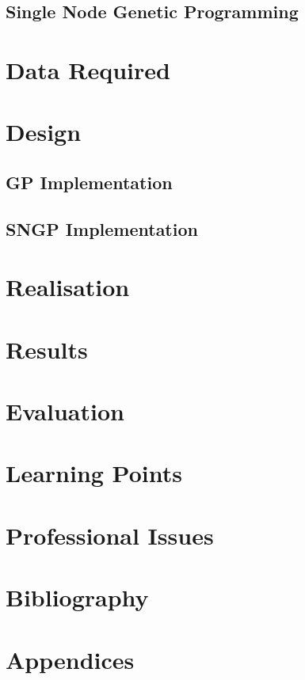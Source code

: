 \documentclass{article}
\begin{document}
		\subsection{Single Node Genetic Programming}
		 
		
	
	\section{Data Required}
	
	\section{Design}
	
		\subsection{GP Implementation}
		
		\subsection{SNGP Implementation}
	
	\section{Realisation}
	
	\section{Results}
	
	
	
	\section{Evaluation}
	
	\section{Learning Points}
	
	\section{Professional Issues}
	
	\section{Bibliography}
	
		
		
	
	\section{Appendices}
		
\end{document}

